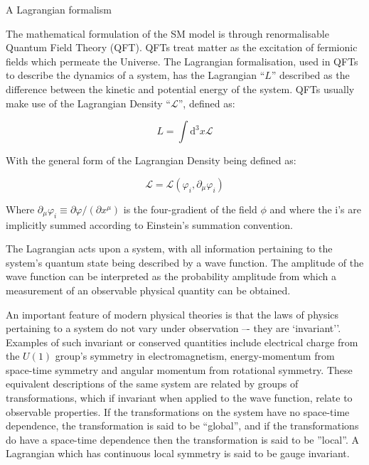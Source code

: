 A Lagrangian formalism  

The mathematical formulation of the SM model is through renormalisable Quantum Field Theory (QFT)\cite{LagrangiansSM}. 
QFTs treat matter as the excitation of fermionic fields which permeate the Universe. 
The Lagrangian formalisation, used in QFTs to describe the dynamics of a system, has the Lagrangian ``$L$'' described as the difference between the kinetic and potential energy of the system\cite{LagrangiansSM}. 
QFTs usually make use of the Lagrangian Density ``$\mathcal{L}$'', defined as\cite{QFT}:

\begin{equation}
L = \int \mathrm{d^{3}}x \mathcal{L}
\end{equation}

With the general form of the Lagrangian Density being defined as:

\begin{equation}
\mathcal{L} = \mathcal{L} ( \varphi_{i}, \partial _{\mu} \varphi_{i} )
\end{equation}

Where $\partial _{\mu}\varphi_{i} \equiv \partial \varphi / (\partial x^{\mu} )$ is the four-gradient of the field $\phi$ and where the i's are implicitly summed according to Einstein's summation convention\cite{ElectroweakStrong}.

The Lagrangian acts upon a system, with all information pertaining to the system's quantum state being described by a wave function. 
The amplitude of the wave function can be interpreted as the probability amplitude from which a measurement of an observable physical quantity can be obtained\cite{Isham}. 

An important feature of modern physical theories is that the laws of physics pertaining to a system do not vary under observation –- they are `invariant''. 
Examples of such invariant or conserved quantities include electrical charge from the $U(1)$ group’s symmetry in electromagnetism, energy-momentum from space-time symmetry and angular momentum from rotational symmetry\cite{Haywood}. 
These equivalent descriptions of the same system are related by groups of transformations, which if invariant when applied to the wave function, relate to observable properties\cite{QFT}. 
If the transformations on the system have no space-time dependence, the transformation is said to be ``global'', and if the transformations do have a space-time dependence then the transformation is said to be ''local''. 
A Lagrangian which has continuous local symmetry is said to be gauge invariant\cite{Haywood}. 

